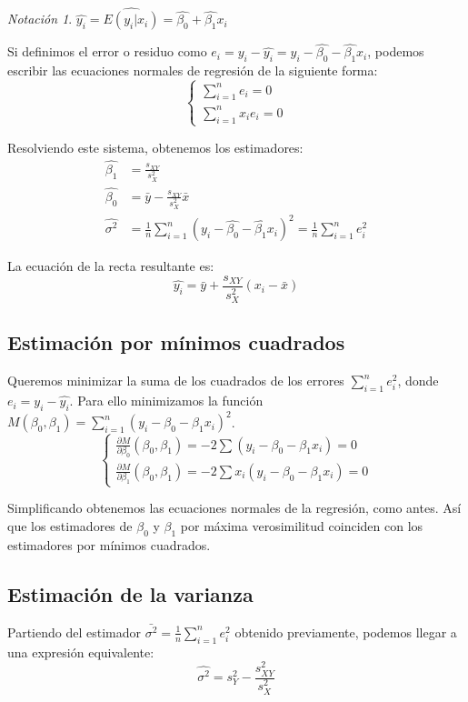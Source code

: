 \documentclass{report}
\theoremstyle{remark}
\theoremstyle{remark}
\theoremstyle{remark}
\newtheorem*{notation}{Notación}
\theoremstyle{definition}
\theoremstyle{definition}
\theoremstyle{definition}
\begin{document}
\begin{notation}
    $\hat{y_i} = \hat{E(y_i | x_i)} = \hat{\beta_0} + \hat{\beta_1}x_i$
\end{notation}

Si definimos el error o residuo como $e_i = y_i - \hat{y_i} = y_i - \hat{\beta_0} - \hat{\beta_1}x_i$, podemos escribir las ecuaciones normales de regresión de la siguiente forma:
$$\begin{cases}
        \sum_{i=1}^n e_i = 0 \\
        \sum_{i=1}^n x_ie_i = 0
    \end{cases}$$

Resolviendo este sistema, obtenemos los estimadores:
\begin{align*}
    \hat{\beta_1}  & = \frac{s_{XY}}{s_X^2}                                                                                 \\
    \hat{\beta_0}  & = \bar{y} - \frac{s_{XY}}{s_X^2}\bar{x}                                                                \\
    \hat{\sigma^2} & = \frac{1}{n} \sum_{i=1}^n (y_i - \hat{\beta_0} - \hat{\beta_1}x_i)^2 = \frac{1}{n} \sum_{i=1}^n e_i^2
\end{align*}

La ecuación de la recta resultante es:
$$\hat{y_i} = \bar{y} + \frac{s_{XY}}{s_X^2}(x_i - \bar{x})$$

\subsection*{Estimación por mínimos cuadrados}
Queremos minimizar la suma de los cuadrados de los errores $\sum_{i=1}^n e_i^2$, donde $e_i = y_i - \hat{y_i}$.
Para ello minimizamos la función $M(\beta_0, \beta_1) = \sum_{i=1}^n (y_i - \beta_0 - \beta_1x_i)^2$.
$$\begin{cases}
        \frac{\partial M}{\partial \beta_0}(\beta_0, \beta_1) = -2\sum(y_i - \beta_0 - \beta_1x_i) = 0 \\
        \frac{\partial M}{\partial \beta_1}(\beta_0, \beta_1) = -2\sum x_i(y_i - \beta_0 - \beta_1x_i) = 0
    \end{cases}$$

Simplificando obtenemos las ecuaciones normales de la regresión, como antes.
Así que los estimadores de $\beta_0$ y $\beta_1$ por máxima verosimilitud coinciden con los estimadores por mínimos cuadrados.

\subsection*{Estimación de la varianza}
Partiendo del estimador $\bar{\sigma^2} = \frac{1}{n} \sum_{i=1}^n e_i^2$ obtenido previamente, podemos llegar a una expresión equivalente:
$$\hat{\sigma^2} = s_Y^2 - \frac{s_{XY}^2}{s_X^2}$$
\end{document}

